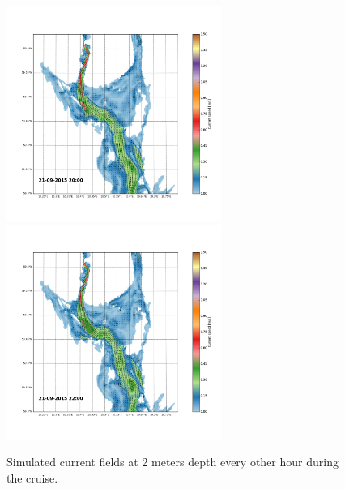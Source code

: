 \documentclass[12pt,a4paper,english]{article}
\begin{document}
\begin{figure}[ht]
{}
\centerline{
\includegraphics*[trim=2.0cm 3cm 6.0cm 3.5cm,clip=true,height=7cm]{Python/stromfelt_78}
\includegraphics*[trim=3.7cm 3cm 1.3cm 3.5cm,clip=true,height=7cm]{Python/stromfelt_80}
}
\caption{\small
Simulated current fields at 2 meters depth every other hour during the cruise.}
\label{fig:Current1}
\end{figure}
\end{document}

